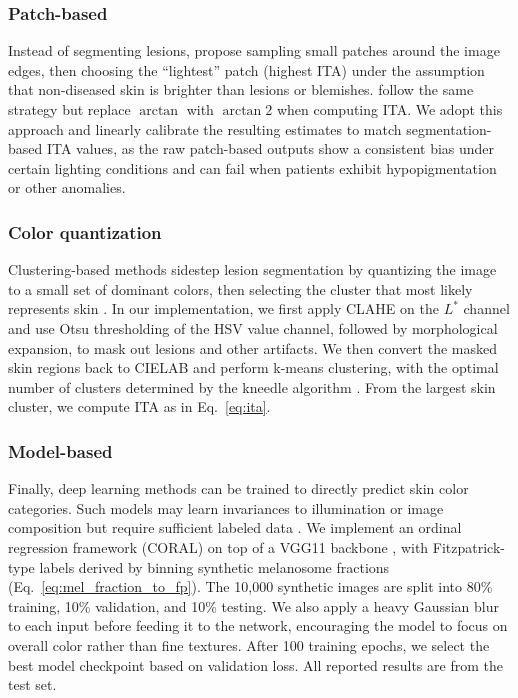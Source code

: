 \documentclass[a4paper,conference]{IEEEtran}
\begin{document}
\subsubsection{Patch-based}
Instead of segmenting lesions, \citet{bevanDetectingMelanomaFairly2022} propose sampling small patches around the image 
edges, then choosing the ``lightest'' patch (highest ITA) under the assumption that non-diseased skin is brighter than 
lesions or blemishes. \citet{kalbRevisitingSkinTone2023} follow the same strategy but replace \(\arctan\) 
with \(\arctan2\) when computing ITA. We adopt this approach and linearly calibrate the resulting estimates to match 
segmentation-based ITA values, as the raw patch-based outputs show a consistent bias under certain lighting conditions 
and can fail when patients exhibit hypopigmentation or other anomalies.

\subsubsection{Color quantization}
Clustering-based methods sidestep lesion segmentation by quantizing the image to a small set of dominant colors, then 
selecting the cluster that most likely represents skin \cite{bencevicUnderstandingSkinColor2024a}. In our implementation, 
we first apply CLAHE on the \(L^*\) channel and use Otsu thresholding of the HSV value channel, followed by morphological 
expansion, to mask out lesions and other artifacts. We then convert the masked skin regions back to CIELAB and perform 
k-means clustering, with the optimal number of clusters determined by the kneedle algorithm \cite{satopaFindingKneedleHaystack2023}. 
From the largest skin cluster, we compute ITA as in Eq.~\ref{eq:ita}.

\subsubsection{Model-based}
Finally, deep learning methods can be trained to directly predict skin color categories. Such models may learn invariances 
to illumination or image composition but require sufficient labeled data \cite{grohEvaluatingDeepNeural2021}. We implement 
an ordinal regression framework (CORAL) \cite{coral2020} on top of a VGG11 backbone \cite{simonyanVeryDeepConvolutional2015}, 
with Fitzpatrick-type labels derived by binning synthetic melanosome fractions (Eq.~\ref{eq:mel_fraction_to_fp}). The 
10{,}000 synthetic images are split into 80\% training, 10\% validation, and 10\% testing. We also apply a heavy Gaussian 
blur to each input before feeding it to the network, encouraging the model to focus on overall color rather than fine 
textures. After 100 training epochs, we select the best model checkpoint based on validation loss. All reported results 
are from the test set.
\end{document}
